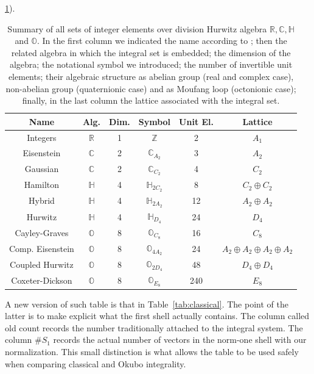 \documentclass{birkjour}
\numberwithin{equation}{section}
\begin{document}
\ref{tab:Johnson Integers}).
\begin{table}
\centering{}%
\begin{tabular}{|c|c|c|c|c|c|}
\hline 
\textbf{Name} & \textbf{Alg.} & \textbf{Dim.} & \textbf{Symbol} & \textbf{Unit El.} & \textbf{Lattice}\tabularnewline
\hline 
\hline 
Integers & $\mathbb{R}$ & 1 & $\mathbb{Z}$ & 2 & $A_{1}$\tabularnewline
\hline 
Eisenstein & $\mathbb{C}$ & 2 & $\mathbb{C}_{A_{2}}$ & 3 & $A_{2}$\tabularnewline
\hline 
Gaussian & $\mathbb{C}$ & 2 & $\mathbb{C}_{C_{2}}$ & 4 & $C_{2}$\tabularnewline
\hline 
Hamilton & $\mathbb{H}$ & 4 & $\mathbb{H}_{2C_{2}}$ & 8 & $C_{2}\oplus C_{2}$\tabularnewline
\hline 
Hybrid & $\mathbb{H}$ & 4 & $\mathbb{H}_{2A_{2}}$ & 12 & $A_{2}\oplus A_{2}$\tabularnewline
\hline 
Hurwitz & $\mathbb{H}$ & 4 & $\mathbb{H}_{D_{4}}$ & 24 & $D_{4}$\tabularnewline
\hline 
Cayley-Graves & $\mathbb{O}$ & 8 & $\mathbb{O}_{C_{8}}$ & 16 & $C_{8}$\tabularnewline
\hline 
Comp. Eisenstein & $\mathbb{O}$ & 8 & $\mathbb{O}_{4A_{2}}$ & 24 & $A_{2}\oplus A_{2}\oplus A_{2}\oplus A_{2}$\tabularnewline
\hline 
Coupled Hurwitz & $\mathbb{O}$ & 8 & $\mathbb{O}_{2D_{4}}$ & 48 & $D_{4}\oplus D_{4}$\tabularnewline
\hline 
Coxeter-Dickson & $\mathbb{O}$ & 8 & $\mathbb{O}_{E_{8}}$ & 240 & $E_{8}$\tabularnewline
\hline 
\end{tabular}\caption{\label{tab:Johnson Integers}Summary of all  sets
of integer elements over division Hurwitz algebra $\mathbb{R},\mathbb{C},\mathbb{H}$
and $\mathbb{O}$. In the first column we indicated the name according
to \cite{Jo13}; then the related algebra in which the integral set
is embedded; the dimension of the algebra; the notational symbol we
introduced; the number of invertible unit elements; their algebraic
structure as abelian group (real and complex case), non-abelian group
(quaternionic case) and as Moufang loop (octonionic case); finally,
in the last column the lattice associated with the integral set.}
\end{table}

A new version of such table is that in Table~\ref{tab:classical}. The point of the latter  is to make explicit what the first shell actually
contains. The column called old count records the number traditionally attached
to the integral system. The column \(\#S_1\) records the actual number of
vectors in the norm-one shell with our normalization. This small distinction
is what allows the table to be used safely when comparing classical and Okubo
integrality.
\end{document}
